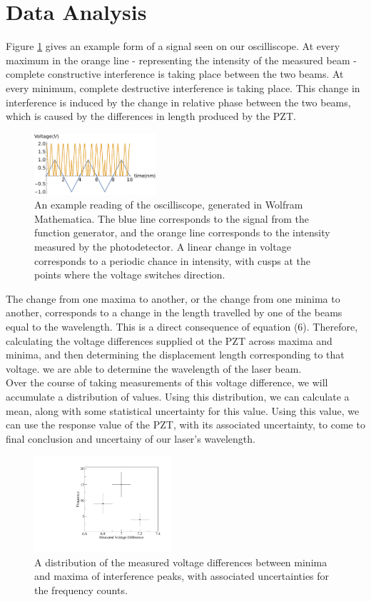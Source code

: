   \section{Data Analysis}
    Figure \ref{fig:waveform} gives an example form of a signal seen on our oscilliscope. At every maximum in the orange line - representing the intensity of the measured beam - complete constructive interference is taking place between the two beams. At every minimum, complete destructive interference is taking place. This change in interference is induced by the change in relative phase between the two beams, which is caused by the differences in length produced by the PZT.
   \begin{figure}[t]
    \includegraphics[width=0.4\textwidth]{waveform.pdf}
    \caption{An example reading of the oscilliscope, generated in Wolfram Mathematica. The blue line corresponds to the signal from the function generator, and the orange line corresponds to the intensity measured by the photodetector. A linear change in voltage corresponds to a periodic chance in intensity, with cusps at the points where the voltage switches direction.}
    \label{fig:waveform}
    \end{figure}
    The change from one maxima to another, or the change from one minima to another, corresponds to a change in the length travelled by one of the beams equal to the wavelength. This is a direct consequence of equation (6). Therefore, calculating the voltage differences supplied ot the PZT across maxima and minima, and then determining the displacement length corresponding to that voltage. we are able to determine the wavelength of the laser beam.
    \\
    Over the course of taking measurements of this voltage difference, we will accumulate a distribution of values. Using this distribution, we can calculate a mean, along with some statistical uncertainty for this value. Using this value, we can use the response value of the PZT, with its associated uncertainty, to come to final conclusion and uncertainy of our laser's wavelength.
    \begin{figure}[h]
      \includegraphics[width=0.45\textwidth]{graph_times.pdf}
      \caption{A distribution of the measured voltage differences between minima and maxima of interference peaks, with associated uncertainties for the frequency counts.}
      \label{fig:graph}
    \end{figure}
